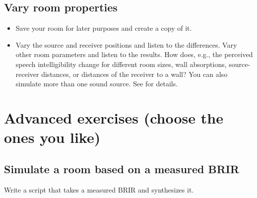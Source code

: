 \documentclass[a4paper, fleqn, 11pt]{article}
\begin{document}
\subsection{Vary room properties}
\begin{itemize}
  \item Save your room for later purposes and create a copy of it.
  \item Vary the source and receiver positions and listen to the differences. Vary other room parameters and listen to the results. How does, e.g., the perceived speech intelligibility change for different room sizes, wall absorptions, source-receiver distances, or distances of the receiver to a wall? You can also simulate more than one sound source. See  for details.
\end{itemize}


\section*{\sffamily Advanced exercises (choose the ones you like)}
\subsection{Simulate a room based on a measured BRIR}
Write a script that takes a measured BRIR and synthesizes it.
\end{document}
